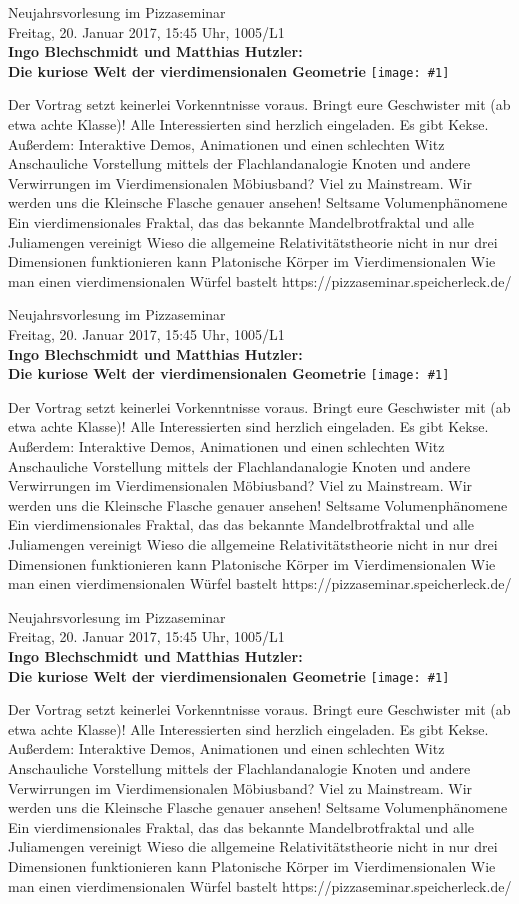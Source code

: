 \documentclass[a4paper,ngerman,landscape]{scrartcl}
\begin{document}
\newcommand{\blurb}[1]{\begin{center}
  \huge
  \vspace*{0.0em}
  Neujahrsvorlesung im Pizzaseminar \\
  Freitag, 20. Januar 2017, 15:45 Uhr, 1005/L1 \\
  \Huge
  \textbf{Ingo Blechschmidt und Matthias Hutzler: \\ Die kuriose Welt der
  vierdimensionalen Geometrie}
  \vfill
  \vspace{0.3em}
  \texttt{[image: \#1]}
  \vfill

  \Large
  \begin{minipage}{0.92\textwidth}
    \renewcommand{\baselinestretch}{1.3}

    \setlength\parskip{\medskipamount}
    \vspace{0.3em}
    Der Vortrag setzt keinerlei Vorkenntnisse voraus. Bringt eure Geschwister
    mit (ab etwa achte Klasse)! Alle Interessierten sind herzlich eingeladen.
    Es gibt Kekse. Außerdem: Interaktive Demos, Animationen und einen schlechten Witz
    \textbullet{} Anschauliche Vorstellung mittels der
    Flachlandanalogie
    \textbullet{} Knoten und andere Verwirrungen im Vierdimensionalen
    \textbullet{} Möbiusband? Viel zu Mainstream. Wir werden uns die Kleinsche Flasche
    genauer ansehen!
    \textbullet{} Seltsame Volumenphänomene
    \textbullet{} Ein vierdimensionales Fraktal, das das bekannte Mandelbrotfraktal und
    alle Juliamengen vereinigt
    \textbullet{} Wieso die allgemeine Relativitätstheorie nicht in nur drei Dimensionen
    funktionieren kann
    \textbullet{} Platonische Körper im Vierdimensionalen
    \textbullet{} Wie man einen vierdimensionalen Würfel bastelt
    \vspace{0.3em}
    \hfill\small \textsf{https:/$\!$/pizzaseminar.speicherleck.de/}
  \end{minipage}
\end{center}}

\blurb{great-grand-120-cell}
\blurb{120-cell}
\blurb{flatlandthefilm}
\end{document}
